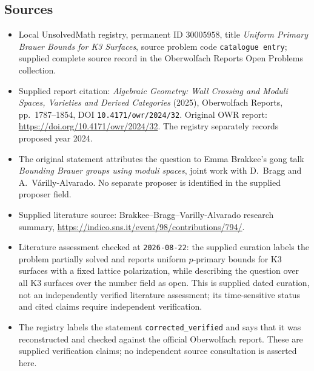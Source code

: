 \documentclass[11pt]{article}
\begin{document}
\subsection{Sources}
\begin{itemize}
\item Local UnsolvedMath registry, permanent ID \(30005958\), title \emph{Uniform Primary Brauer Bounds for K3 Surfaces}, source problem code \texttt{catalogue entry}; supplied complete source record in the Oberwolfach Reports Open Problems collection.
\item Supplied report citation: \emph{Algebraic Geometry: Wall Crossing and Moduli Spaces, Varieties and Derived Categories} (2025), Oberwolfach Reports, pp.~1787--1854, DOI \texttt{10.4171/owr/2024/32}. Original OWR report: \url{https://doi.org/10.4171/owr/2024/32}. The registry separately records proposed year 2024.
\item The original statement attributes the question to Emma Brakkee's gong talk \emph{Bounding Brauer groups using moduli spaces}, joint work with D.~Bragg and A.~V\'arilly-Alvarado. No separate proposer is identified in the supplied proposer field.
\item Supplied literature source: Brakkee--Bragg--Varilly-Alvarado research summary, \url{https://indico.sns.it/event/98/contributions/794/}.
\item Literature assessment checked at \texttt{2026-08-22}: the supplied curation labels the problem partially solved and reports uniform \(p\)-primary bounds for K3 surfaces with a fixed lattice polarization, while describing the question over all K3 surfaces over the number field as open. This is supplied dated curation, not an independently verified literature assessment; its time-sensitive status and cited claims require independent verification.
\item The registry labels the statement \texttt{corrected\_verified} and says that it was reconstructed and checked against the official Oberwolfach report. These are supplied verification claims; no independent source consultation is asserted here.
\end{itemize}
\end{document}
